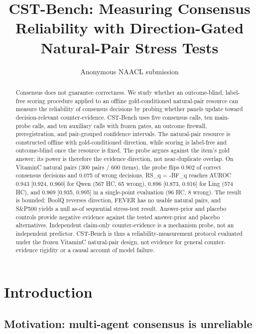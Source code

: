 \documentclass[11pt]{article}
\title{CST-Bench: Measuring Consensus Reliability with Direction-Gated Natural-Pair Stress Tests}
\author{Anonymous NAACL submission}
\begin{document}
\maketitle

\begin{abstract}
Consensus does not guarantee correctness. We study whether an outcome-blind, label-free scoring procedure applied to an offline gold-conditioned natural-pair resource can measure the reliability of consensus decisions by probing whether panels update toward decision-relevant counter-evidence. CST-Bench uses five consensus calls, ten main-probe calls, and ten auxiliary calls with frozen gates, an outcome firewall, preregistration, and pair-grouped confidence intervals. The natural-pair resource is constructed offline with gold-conditioned direction, while scoring is label-free and outcome-blind once the resource is fixed. The probe argues against the item's gold answer; its power is therefore the evidence direction, not near-duplicate overlap. On VitaminC natural pairs (300 pairs / 600 items), the probe flips 0.902 of correct consensus decisions and 0.075 of wrong decisions. RS\_\allowbreak{}q = -BF\_\allowbreak{}q reaches AUROC 0.943 [0.924, 0.960] for Qwen (567 HC, 65 wrong), 0.896 [0.873, 0.916] for Ling (574 HC), and 0.969 [0.935, 0.995] in a single-point evaluation (96 HC, 8 wrong). The result is bounded: BoolQ reverses direction, FEVER has no usable natural pairs, and S\&P500 yields a null as-of sequential stress-test result. Answer-prior and placebo controls provide negative evidence against the tested answer-prior and placebo alternatives. Independent claim-only counter-evidence is a mechanism probe, not an independent predictor. CST-Bench is thus a reliability-measurement protocol evaluated under the frozen VitaminC natural-pair design, not evidence for general counter-evidence rigidity or a causal account of model failure.
\end{abstract}


\section{Introduction}

\subsection{Motivation: multi-agent consensus is unreliable}
\end{document}
